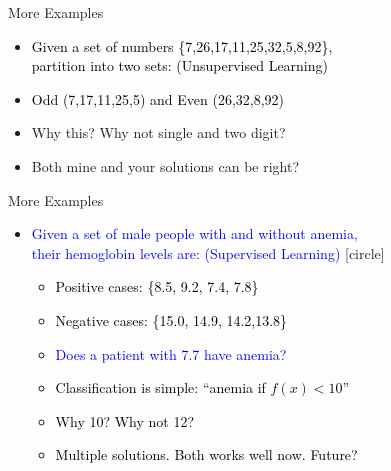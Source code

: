 \documentclass[aspectratio=169,14pt]{beamer}
\begin{document}
\begin{frame}{More Examples}
\begin{itemize}
\item<2-> \textcolor{black}{Given a set of numbers \{7,26,17,11,25,32,5,8,92\},\\
  partition into two sets: (Unsupervised Learning) \vspace{10pt}}
\item<3-> \textcolor{black}{Odd (7,17,11,25,5) and \vspace{10pt} Even (26,32,8,92)} 
\item<4-> \alert{Why this? Why not single and two \vspace{10pt} digit?}
\item<5-> \alert{Both mine and your solutions can be right?}
\end{itemize}
\end{frame}

\begin{frame}{More Examples }
\begin{itemize}
\item<1-> \textcolor{blue}{ Given a set of male people with and without  anemia,\\         their hemoglobin levels are: (Supervised  Learning)\vspace{5pt} }
[circle]
  \begin{itemize}
  \item<2-> \textcolor{black}{Positive cases: \{8.5, 9.2, 7.4, 7.8\}}
  \item<3-> \textcolor{black}{Negative cases: \{15.0, 14.9, 14.2,13.8\}}
  \item<4-> \textcolor{blue}{Does a patient with 7.7 have anemia?}
  \item<5-> \textcolor{black}{Classification is simple: “anemia if\alert{ $f(x)<10$}”}
  \item<6-> \textcolor{black}{Why 10? Why not 12?}
  \item<7-> \textcolor{black}{Multiple solutions. Both works well now. Future?} 
  \end{itemize}
\end{itemize}
\end{frame}
\end{document}

